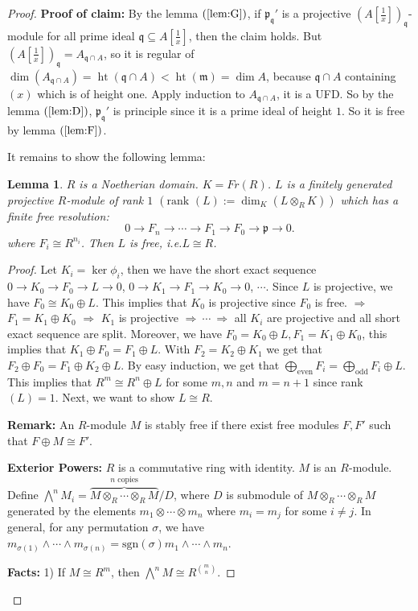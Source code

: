 \documentclass[cs4size]{article}
\newcommand{\su}{\subseteq}
\newcommand{\frm}{\mathfrak{m}}
\newcommand{\frp}{\mathfrak{p}}
\newcommand{\frq}{\mathfrak{q}}
\newcommand{\ra}{\rightarrow}
\newcommand{\Ra}{\Rightarrow}
\DeclareMathOperator{\height}{ht}
\newtheorem{lem}{Lemma}
\begin{document}
\begin{proof}
\textbf{Proof of claim:} By the lemma $(\ref{lem:G})$, if $\frp_\frq'$ is a projective $(A[\frac{1}{x}])_\frq$-module for all prime ideal $\frq\su A[\frac{1}{x}]$, then the claim holds. But $(A[\frac{1}{x}])_\frq=A_{\frq\cap A}$, so it is regular of $\dim (A_{\frq\cap A})=\height(\frq\cap A)<\height(\frm)=\dim A$, because $\frq\cap A$ containing $(x)$ which is of height one. Apply induction to $A_{\frq\cap A}$, it is a UFD. So by the lemma $(\ref{lem:D})$, $\frp_\frq'$ is principle since it is a prime ideal of height $1$. So it is free by lemma $(\ref{lem:F})$.

It remains to show the following lemma:
\begin{lem}
$R$ is a Noetherian domain. $K=Fr(R)$. $L$ is a finitely generated projective $R$-module of rank $1$ $(\text{rank }(L):=\dim_K(L\otimes_RK))$ which has a finite free resolution:
\[0\ra F_n\ra \cdots\ra F_1\ra F_0\ra \frp\ra 0.\]
where $F_i\cong R^{n_i}$. Then $L$ is free, i.e.$L\cong R$.
\end{lem}
\begin{proof}
Let $K_i=\ker \phi_i$, then we have the short exact sequence $0\ra K_0\ra F_0\ra L\ra 0$, $0\ra K_1\ra F_1\ra K_0\ra 0$, $\cdots$. Since $L$ is projective, we have $F_0\cong K_0\oplus L$. This implies that $K_0$ is projective since $F_0$ is free. $\Ra$ $F_1=K_1\oplus K_0$ $\Ra$ $K_1$ is projective $\Ra\ \cdots\ \Ra$ all $K_i$ are projective and all short exact sequence are split. Moreover, we have $F_0=K_0\oplus L, F_1=K_1\oplus K_0$, this implies that $K_1\oplus F_0=F_1\oplus L$. With $F_2=K_2\oplus K_1$ we get that $F_2\oplus F_0=F_1\oplus K_2\oplus L$. By easy induction, we get that $\bigoplus_{\text{even}}F_i=\bigoplus_{\text{odd}}F_i\oplus L$. This implies that $R^m\cong R^n\oplus L$ for some $m,n$ and $m=n+1$ since rank $(L)=1$. Next, we want to show $L\cong R$.

\textbf{Remark:} An $R$-module $M$ is stably free if there exist free modules $F,F'$ such that $F\oplus M\cong F'$.

\textbf{Exterior Powers:} $R$ is a commutative ring with identity. $M$ is an $R$-module. Define $\bigwedge^nM_i=\overbrace{ M\otimes_R\cdots\otimes_RM }^{n \text{ copies}}/D$, where $D$ is submodule of $M\otimes_R\cdots\otimes_RM$ generated by the elements $m_1\otimes \cdots\otimes m_n$ where $m_i=m_j$ for some $i\neq j$. In general, for any permutation $\sigma$, we have $m_{\sigma(1)}\wedge\cdots\wedge m_{\sigma(n)}=\text{sgn}(\sigma) m_1\wedge\cdots\wedge m_n$.

\textbf{Facts:} 1) If $M\cong R^m$, then $\bigwedge^nM\cong R^{\binom{m}{n}}$.


\end{proof}
\end{proof}
\end{document}
